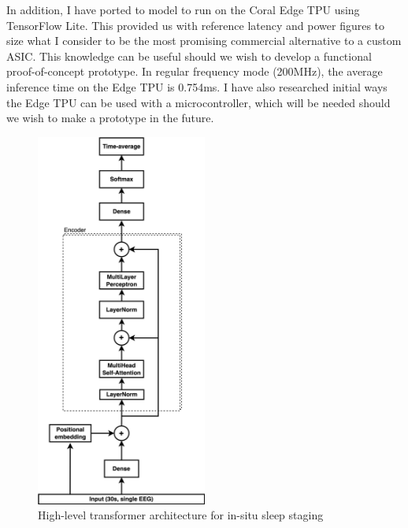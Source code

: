 \documentclass[12pt]{article}
\begin{document}
    In addition, I have ported to model to run on the Coral Edge TPU using TensorFlow Lite. This provided us with reference latency and power figures to size what I consider to be the most promising
    commercial alternative to a custom ASIC. This knowledge can be useful should we wish to develop a functional proof-of-concept prototype. In regular frequency mode (200MHz), the average inference time on the Edge TPU is 0.754ms. I have also researched initial ways the Edge TPU can be used with a
    microcontroller, which will be needed should we wish to make a prototype in the future.

    \begin{figure}
        \centering
        \includegraphics[width=0.5\textwidth]{assets/vit.jpg}
        \caption{High-level transformer architecture for in-situ sleep staging}
        \label{fig:vit}
    \end{figure}
\end{document}
